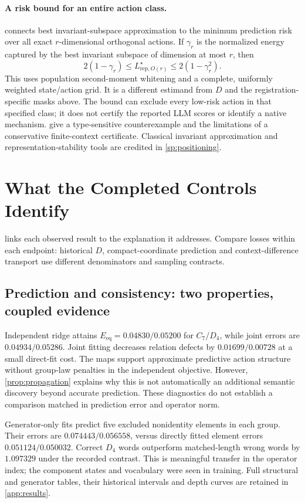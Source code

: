 \documentclass{article}
\newcommand{\Eeq}{E_{\mathrm{eq}}}
\begin{document}
\paragraph{A risk bound for an entire action class.}
 connects best invariant-subspace approximation to the minimum prediction risk over all exact $r$-dimensional orthogonal actions. If $\gamma_r$ is the normalized energy captured by the best invariant subspace of dimension at most $r$, then
\[
 2(1-\gamma_r)\le L^\star_{\mathrm{rep},O(r)}
 \le 2(1-\gamma_r^2).
\]
This uses population second-moment whitening and a complete, uniformly weighted state/action grid. It is a different estimand from $D$ and the registration-specific masks above. The bound can exclude every low-risk action in that specified class; it does not certify the reported LLM scores or identify a native mechanism.  give a type-sensitive counterexample and the limitations of a conservative finite-context certificate. Classical invariant approximation and representation-stability tools are credited in \cref{sp:positioning}.


\section{What the Completed Controls Identify}
\label{sec:evidence}
 links each observed result to the explanation it addresses. Compare losses within each endpoint: historical $D$, compact-coordinate prediction and context-difference transport use different denominators and sampling contracts.

\subsection{Prediction and consistency: two properties, coupled evidence}
Independent ridge attains $\Eeq=0.04830/0.05200$ for $C_7/D_4$, while joint errors are $0.04934/0.05286$. Joint fitting decreases relation defects by $0.01699/0.00728$ at a small direct-fit cost. The maps support approximate predictive action structure without group-law penalties in the independent objective. However, \cref{prop:propagation} explains why this is not automatically an additional semantic discovery beyond accurate prediction. These diagnostics do not establish a comparison matched in prediction error and operator norm.

Generator-only fits predict five excluded nonidentity elements in each group. Their errors are $0.074443/0.056558$, versus directly fitted element errors $0.051124/0.050032$. Correct $D_4$ words outperform matched-length wrong words by $1.097329$ under the recorded contrast. This is meaningful transfer in the operator index; the component states and vocabulary were seen in training. Full structural and generator tables, their historical intervals and depth curves are retained in \cref{app:results}.
\end{document}
